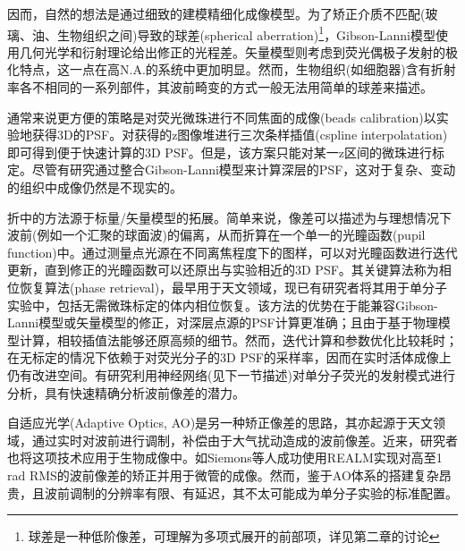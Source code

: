 \documentclass[draft=false,oneside]{fduthesis}
\begin{document}
    \par 因而，自然的想法是通过细致的建模精细化成像模型。为了矫正介质不匹配(玻璃、油、生物组织之间)导致的球差(spherical aberration)\footnote{球差是一种低阶像差，可理解为多项式展开的前部项，详见第二章的讨论}，Gibson-Lanni模型\cite{gibsonExperimentalTestAnalytical1991}使用几何光学和衍射理论给出修正的光程差。矢量模型\cite{torokElectromagneticDiffractionLight1997}则考虑到荧光偶极子发射的极化特点，这一点在高N.A.的系统中更加明显。然而，生物组织(如细胞器)含有折射率各不相同的一系列部件，其波前畸变的方式一般无法用简单的球差来描述。

    \par 通常来说更方便的策略是对荧光微珠进行不同焦面的成像(beads calibration)以实验地获得3D的PSF。对获得的z图像堆进行三次条样插值(cspline interpolatation)\cite{liRealtime3DSinglemolecule2018}即可得到便于快速计算的3D PSF。但是，该方案只能对某一z区间的微珠进行标定。尽管有研究通过整合Gibson-Lanni模型\cite{mcgortyCorrectionDepthdependentAberrations2014}来计算深层的PSF，这对于复杂、变动的组织中成像仍然是不现实的。

    \par 折中的方法源于标量/矢量模型的拓展。简单来说，像差可以描述为与理想情况下波前(例如一个汇聚的球面波)的偏离，从而折算在一个单一的光瞳函数(pupil function)中。通过测量点光源在不同离焦程度下的图样，可以对光瞳函数进行迭代更新，直到修正的光瞳函数可以还原出与实验相近的3D PSF。其关键算法称为相位恢复算法(phase retrieval)\cite{hanserPhaseRetrievalHighnumericalaperture2003,hanserPhaseretrievedPupilFunctions2004}，最早用于天文领域，现已有研究者将其用于单分子实验中\cite{liuThreeDimensionalSingle2013}，包括无需微珠标定的体内相位恢复\cite{xuThreedimensionalNanoscopyWhole2020}。该方法的优势在于能兼容Gibson-Lanni模型或矢量模型的修正，对深层点源的PSF计算更准确；且由于基于物理模型计算，相较插值法能够还原高频的细节。然而，迭代计算和参数优化比较耗时；在无标定的情况下依赖于对荧光分子的3D PSF的采样率，因而在实时活体成像上仍有改进空间。有研究利用神经网络(见下一节描述)对单分子荧光的发射模式进行分析\cite{zhangAnalyzingComplexSinglemolecule2018}，具有快速精确分析波前像差的潜力。
    
    \par 自适应光学(Adaptive Optics, AO)是另一种矫正像差的思路，其亦起源于天文领域，通过实时对波前进行调制，补偿由于大气扰动造成的波前像差。近来，研究者也将这项技术应用于生物成像中。如Siemons等人成功使用REALM实现对高至1 rad RMS的波前像差的矫正并用于微管的成像\cite{siemonsRobustAdaptiveOptics2021}。然而，鉴于AO体系的搭建复杂昂贵，且波前调制的分辨率有限、有延迟，其不太可能成为单分子实验的标准配置。
    
\end{document}
